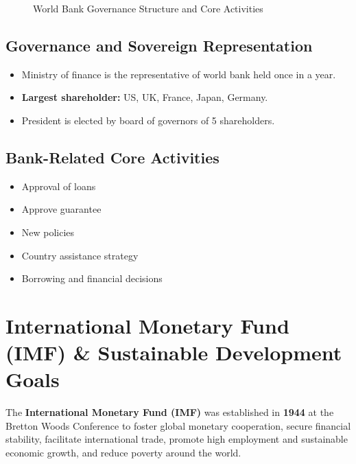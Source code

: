 \begin{figure}[htbp]
{%
    }
    \caption{World Bank Governance Structure and Core Activities}
    \label{fig:wb_governance_flowchart}
\end{figure}

\subsection{Governance and Sovereign Representation}
\begin{itemize}[leftmargin=*]
    \item Ministry of finance is the representative of world bank held once in a year.
    \item \textbf{Largest shareholder:} US, UK, France, Japan, Germany.
    \item President is elected by board of governors of 5 shareholders.
\end{itemize}

\subsection{Bank-Related Core Activities}
\begin{itemize}[leftmargin=*]
    \item Approval of loans
    \item Approve guarantee
    \item New policies
    \item Country assistance strategy
    \item Borrowing and financial decisions
\end{itemize}

\section{International Monetary Fund (IMF) \& Sustainable Development Goals}

\begin{formulabox}
The \textbf{International Monetary Fund (IMF)} was established in \textbf{1944} at the Bretton Woods Conference to foster global monetary cooperation, secure financial stability, facilitate international trade, promote high employment and sustainable economic growth, and reduce poverty around the world.
\end{formulabox}

